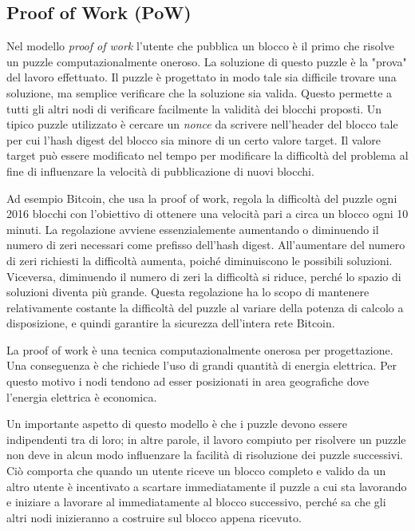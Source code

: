 \subsection{Proof of Work (PoW)}
Nel modello \textit{proof of work} l'utente che pubblica un blocco è il primo che risolve
un puzzle computazionalmente oneroso. La soluzione di questo puzzle è la "prova" del lavoro effettuato.
Il puzzle è progettato in modo tale sia difficile trovare una soluzione, ma semplice verificare che la soluzione
sia valida. Questo permette a tutti gli altri nodi di verificare facilmente la validità dei blocchi proposti.
Un tipico puzzle utilizzato è cercare un \textit{nonce} da scrivere nell'header del blocco
tale per cui l'hash digest del blocco sia minore di un certo valore target.
Il valore target può essere modificato nel tempo per modificare la difficoltà del problema al fine di
influenzare la velocità di pubblicazione di nuovi blocchi.

Ad esempio Bitcoin, che usa la proof of work, regola la difficoltà del puzzle ogni 2016 blocchi
con l'obiettivo di ottenere una velocità pari a circa un blocco ogni 10 minuti. La regolazione
avviene essenzialemente aumentando o diminuendo il numero di zeri necessari come prefisso dell'hash digest.
All'aumentare del numero di zeri richiesti la difficoltà aumenta, poiché diminuiscono le possibili soluzioni.
Viceversa, diminuendo il numero di zeri la difficoltà si riduce, perché lo spazio di soluzioni diventa più grande.
Questa regolazione ha lo scopo di mantenere relativamente costante la difficoltà del puzzle al variare della
potenza di calcolo a disposizione, e quindi garantire la sicurezza dell'intera rete Bitcoin.

La proof of work è una tecnica computazionalmente onerosa per progettazione. Una conseguenza è che richiede
l'uso di grandi quantità di energia elettrica. Per questo motivo
i nodi tendono ad esser posizionati
in area geografiche dove l'energia elettrica è economica.

Un importante aspetto di questo modello è che i puzzle devono essere indipendenti tra di loro; in
altre parole, il lavoro compiuto per risolvere un puzzle non deve in alcun modo influenzare la facilità di
risoluzione dei puzzle successivi. Ciò comporta che quando un utente riceve un blocco completo
e valido da un altro utente è incentivato a scartare immediatamente il puzzle a cui sta lavorando e
iniziare a lavorare al immediatamente al blocco successivo, perché sa che gli altri nodi
inizieranno a costruire sul blocco appena ricevuto.


